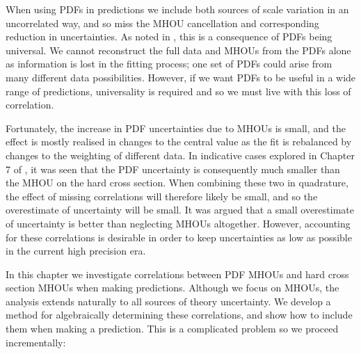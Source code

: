 When using PDFs in predictions we include both sources of scale variation in an uncorrelated way, and so miss the MHOU cancellation and corresponding reduction in uncertainties. As noted in \cite{AbdulKhalek:2019ihb}, this is a consequence of PDFs being universal. We cannot reconstruct the full data and MHOUs from the PDFs alone as information is lost in the fitting process; one set of PDFs could arise from many different data possibilities. However, if we want PDFs to be useful in a wide range of predictions, universality is required and so we must live with this loss of correlation.

Fortunately, the increase in PDF uncertainties due to MHOUs is small, and the effect is mostly realised in changes to the central value as the fit is rebalanced by changes to the weighting of different data. In indicative cases explored in Chapter 7 of \cite{AbdulKhalek:2019ihb}, it was seen that the PDF uncertainty is consequently much smaller than the MHOU on the hard cross section. When combining these two in quadrature, the effect of missing correlations will therefore likely be small, and so the overestimate of uncertainty will be small. It was argued that a small overestimate of uncertainty is better than neglecting MHOUs altogether. However, accounting for these correlations is desirable in order to keep uncertainties as low as possible in the current high precision era.

In this chapter we investigate correlations between PDF MHOUs and hard cross section MHOUs when making predictions. Although we focus on MHOUs, the analysis extends naturally to all sources of theory uncertainty. We develop a method for algebraically determining these correlations, and show how to include them when making a prediction. This is a complicated problem so we proceed incrementally:

